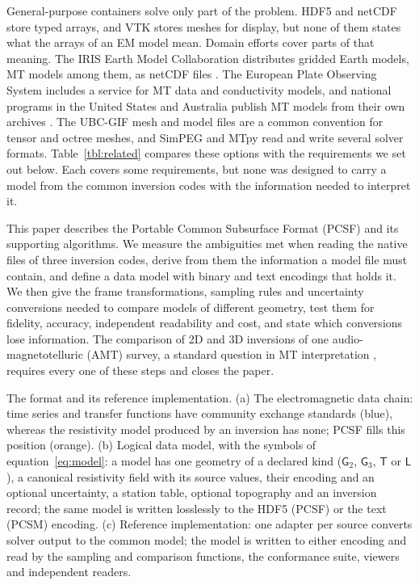 \documentclass[manuscript]{geophysics}
\newcommand{\Gtwo}{\mathsf{G}_{2}}
\newcommand{\Gthree}{\mathsf{G}_{3}}
\newcommand{\Mtri}{\mathsf{T}}
\newcommand{\Lset}{\mathsf{L}}
\begin{document}
General-purpose containers solve only part of the problem. HDF5
\citep{Folk2011} and netCDF \citep{Rew1990} store typed arrays, and
VTK \citep{Schroeder2006} stores meshes for display, but none of them
states what the arrays of an EM model mean. Domain efforts cover parts
of that meaning. The IRIS Earth Model Collaboration distributes
gridded Earth models, MT models among them, as netCDF files
\citep{Trabant2012}. The European Plate Observing System includes a
service for MT data and conductivity models, and national programs in
the United States and Australia publish MT models from their own
archives \citep{Kelbert2020}. The UBC-GIF mesh and model files are a
common convention for tensor and octree meshes, and SimPEG
\citep{Cockett2015} and MTpy \citep{Krieger2014} read and write several
solver formats. Table~\ref{tbl:related} compares these options with
the requirements we set out below. Each covers some requirements, but
none was designed to carry a model from the common inversion codes
with the information needed to interpret it.

This paper describes the Portable Common Subsurface Format (PCSF) and
its supporting algorithms. We measure the ambiguities met when reading
the native files of three inversion codes, derive from them the
information a model file must contain, and define a data model with
binary and text encodings that holds it. We then give the frame
transformations, sampling rules and uncertainty conversions needed to
compare models of different geometry, test them for fidelity,
accuracy, independent readability and cost, and state which
conversions lose information. The comparison of 2D and 3D inversions
of one audio-magnetotelluric (AMT) survey, a standard question in MT
interpretation \citep{Ledo2005}, requires every one of these steps and
closes the paper.

{The format and its reference implementation. (a) The
electromagnetic data chain: time series and transfer functions have
community exchange standards (blue), whereas the resistivity model
produced by an inversion has none; PCSF fills this position (orange).
(b) Logical data model, with the symbols of
equation~\ref{eq:model}: a model has one geometry of a declared kind
($\Gtwo$, $\Gthree$, $\Mtri$ or $\Lset$), a canonical resistivity
field with its source values, their encoding and an optional
uncertainty, a station table, optional topography and an inversion
record; the same model is written losslessly to the HDF5 (PCSF) or
the text (PCSM) encoding. (c) Reference implementation: one adapter
per source converts solver output to the common model; the model is
written to either encoding and read by the sampling and comparison
functions, the conformance suite, viewers and independent readers.}
\end{document}
